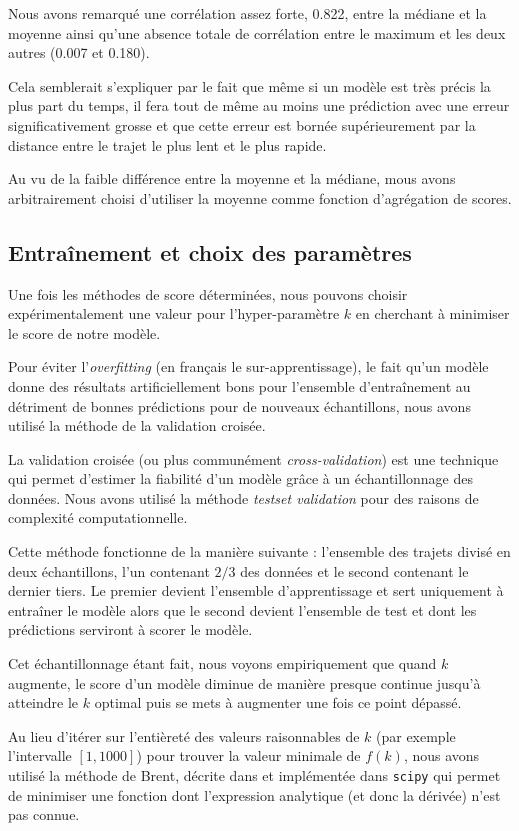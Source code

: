 \documentclass[letterpaper]{article}
\begin{document}
Nous avons remarqué une corrélation assez forte, 0.822, entre la médiane et la moyenne ainsi qu'une absence totale de corrélation entre le maximum et les deux autres (0.007 et 0.180).

Cela semblerait s'expliquer par le fait que même si un modèle est très précis la plus part du temps, il fera tout de même au moins une prédiction avec une erreur significativement grosse et que cette erreur est bornée supérieurement par la distance entre le trajet le plus lent et le plus rapide.

Au vu de la faible différence entre la moyenne et la médiane, mous avons arbitrairement choisi d'utiliser la moyenne comme fonction d'agrégation de scores.

\subsection{Entraînement et choix des paramètres}

Une fois les méthodes de score déterminées, nous pouvons choisir expérimentalement une valeur pour l'hyper-paramètre $k$ en cherchant à minimiser le score de notre modèle.

Pour éviter l'\textit{overfitting} (en français le sur-apprentissage), le fait qu'un modèle donne des résultats artificiellement bons pour l'ensemble d’entraînement au détriment de bonnes prédictions pour de nouveaux échantillons, nous avons utilisé la méthode de la validation croisée.

La validation croisée (ou plus communément \textit{cross-validation}) est une technique qui permet d'estimer la fiabilité d'un modèle grâce à un échantillonnage des données. Nous avons utilisé la méthode \textit{testset validation} pour des raisons de complexité computationnelle.

Cette méthode fonctionne de la manière suivante : l'ensemble des trajets divisé en deux échantillons, l'un contenant $2/3$ des données et le second contenant le dernier tiers. Le premier devient l'ensemble d'apprentissage et sert uniquement à entraîner le modèle alors que le second devient l'ensemble de test et dont les prédictions serviront à scorer le modèle.

Cet échantillonnage étant fait, nous voyons empiriquement que quand $k$ augmente, le score d'un modèle diminue de manière presque continue jusqu'à atteindre le $k$ optimal puis se mets à augmenter une fois ce point dépassé.

Au lieu d'itérer sur l'entièreté des valeurs raisonnables de $k$ (par exemple l’intervalle $[1,1000]$) pour trouver la valeur minimale de $f(k)$, nous avons utilisé la méthode de Brent, décrite dans \cite{rivlin1973algorithms} et implémentée dans \texttt{scipy} qui permet de minimiser une fonction dont l'expression analytique (et donc la dérivée) n'est pas connue.
\end{document}
